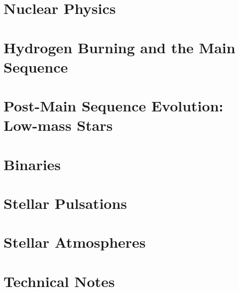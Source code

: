 \documentclass{astro-bookshelf}
\begin{document}
\chapter{Nuclear Physics}


\chapter[Main Sequence]{Hydrogen Burning and the Main Sequence}


\chapter[Low-Mass Post-Main Sequence]{Post-Main Sequence Evolution: Low-mass Stars}


\chapter{Binaries}\label{ch.binaries}


\chapter{Stellar Pulsations}\label{s.pulsations}


\chapter[Stellar Atmospheres]{Stellar Atmospheres}\label{s.stellar-atmospheres}




\appendix
\chapter{Technical Notes}\label{s.technical-notes}


\backmatter


\end{document}
